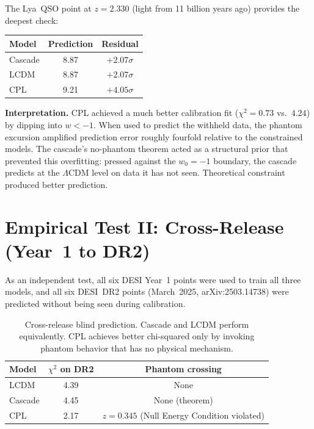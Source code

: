 \documentclass[12pt,a4paper]{article}
\theoremstyle{plain}
\theoremstyle{definition}
\begin{document}
The Lya~QSO point at $z = 2.330$ (light from 11 billion years ago) provides the
deepest check:

\begin{center}
\begin{tabular}{lcc}
\toprule
Model & Prediction & Residual \\
\midrule
Cascade & 8.87 & $+2.07\sigma$ \\
LCDM    & 8.87 & $+2.07\sigma$ \\
CPL     & 9.21 & $+4.05\sigma$ \\
\bottomrule
\end{tabular}
\end{center}

\textbf{Interpretation.} CPL achieved a much better calibration fit
($\chi^2 = 0.73$ vs.\ $4.24$) by dipping into $w < -1$. When used to predict
the withheld data, the phantom excursion amplified prediction error roughly
fourfold relative to the constrained models. The cascade's no-phantom theorem
acted as a structural prior that prevented this overfitting: pressed against
the $w_0 = -1$ boundary, the cascade predicts at the $\Lambda$CDM level on
data it has not seen. Theoretical constraint produced better prediction.

\section{Empirical Test II: Cross-Release (Year~1 to DR2)}
\label{sec:dr2}

As an independent test, all six DESI Year~1 points were used to train all three
models, and all six DESI~DR2 points \cite{desiddr2} (March~2025, arXiv:2503.14738)
were predicted without being seen during calibration.

\begin{table}[h]
\centering
\begin{tabular}{lcc}
\toprule
Model & $\chi^2$ on DR2 & Phantom crossing \\
\midrule
LCDM    & 4.39 & None \\
Cascade & 4.45 & None (theorem) \\
CPL     & 2.17 & $z = 0.345$ (Null Energy Condition violated) \\
\bottomrule
\end{tabular}
\caption{Cross-release blind prediction. Cascade and LCDM perform equivalently.
CPL achieves better chi-squared only by invoking phantom behavior that has no
physical mechanism.}
\end{table}
\end{document}
